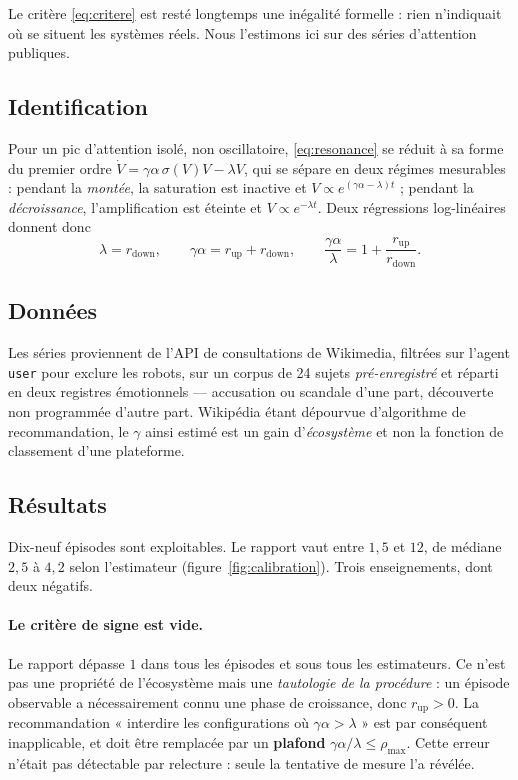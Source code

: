 \documentclass[11pt,a4paper]{article}
\begin{document}
Le critère \eqref{eq:critere} est resté longtemps une inégalité formelle : rien n'indiquait
où se situent les systèmes réels. Nous l'estimons ici sur des séries d'attention publiques.

\subsection{Identification}

Pour un pic d'attention isolé, non oscillatoire, \eqref{eq:resonance} se réduit à sa forme
du premier ordre $\dot V = \gamma\alpha\,\sigma(V)V - \lambda V$, qui se sépare en deux
régimes mesurables : pendant la \emph{montée}, la saturation est inactive et
$V \propto e^{(\gamma\alpha-\lambda)t}$ ; pendant la \emph{décroissance}, l'amplification est
éteinte et $V \propto e^{-\lambda t}$. Deux régressions log-linéaires donnent donc
\begin{equation}
\lambda = r_{\mathrm{down}}, \qquad \gamma\alpha = r_{\mathrm{up}} + r_{\mathrm{down}},
\qquad \frac{\gamma\alpha}{\lambda} = 1 + \frac{r_{\mathrm{up}}}{r_{\mathrm{down}}}.
\label{eq:identification}
\end{equation}

\subsection{Données}

Les séries proviennent de l'API de consultations de Wikimedia, filtrées sur l'agent
\texttt{user} pour exclure les robots, sur un corpus de 24 sujets \emph{pré-enregistré} et
réparti en deux registres émotionnels — accusation ou scandale d'une part, découverte non
programmée d'autre part. Wikipédia étant dépourvue d'algorithme de recommandation, le
$\gamma$ ainsi estimé est un gain d'\emph{écosystème} et non la fonction de classement d'une
plateforme.

\subsection{Résultats}

Dix-neuf épisodes sont exploitables. Le rapport vaut entre $1{,}5$ et $12$, de médiane
$2{,}5$ à $4{,}2$ selon l'estimateur (figure~\ref{fig:calibration}). Trois enseignements,
dont deux négatifs.

\paragraph{Le critère de signe est vide.} Le rapport dépasse $1$ dans tous les épisodes et
sous tous les estimateurs. Ce n'est pas une propriété de l'écosystème mais une
\emph{tautologie de la procédure} : un épisode observable a nécessairement connu une phase de
croissance, donc $r_{\mathrm{up}} > 0$. La recommandation « interdire les configurations où
$\gamma\alpha > \lambda$ » est par conséquent inapplicable, et doit être remplacée par un
\textbf{plafond} $\gamma\alpha/\lambda \leq \rho_{\max}$. Cette erreur n'était pas
détectable par relecture : seule la tentative de mesure l'a révélée.
\end{document}
